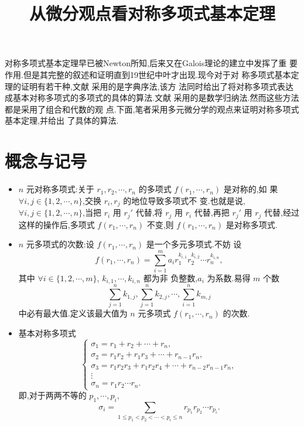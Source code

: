 \documentclass[a4paper]{article}
\begin{document}
\title{\huge{\bf{从微分观点看对称多项式基本定理}}}\date{}
\maketitle
对称多项式基本定理早已被Newton所知,后来又在Galois理论的建立中发挥了重
要作用.但是其完整的叙述和证明直到19世纪中叶才出现\cite{ben}.现今对于对
称多项式基本定理的证明有若干种,文献\cite{zhang} 采用的是字典序法,该方
法同时给出了将对称多项式表达成基本对称多项式的多项式的具体的算法.文献
\cite{edwards} 采用的是数学归纳法.然而这些方法都是采用了组合和代数的观
点.下面,笔者采用多元微分学的观点来证明对称多项式基本定理,并给出
了具体的算法.
\section{概念与记号}
\label{sec:1}
\begin{itemize}
\item $n$ 元对称多项式:关于 $r_1,r_2,\cdots,r_n$ 的多项式 $f(r_1,\cdots,r_n)$ 是对称的,如
  果 $\forall i,j\in \{1,2,\cdots,n\}$,交换 $r_i,r_j$ 的地位导致多项式不
  变.也就是说,$\forall i,j\in \{1,2,\cdots,n\}$,当把 $r_i$ 用 $r_j'$ 代替,将 $r_j$ 用 $r_i$ 代替,再把
  $r_j'$ 用 $r_j$ 代替,经过这样的操作后,多项式 $f(r_1,\cdots,r_n)$ 不变,则
  $f(r_1,\cdots,r_n)$ 是对称多项式.
\item $n$ 元多项式的次数:设 $f(r_1,\cdots,r_n)$ 是一个多元多项式.不妨
  设
$$
f(r_1,\cdots,r_n)=\sum_{i=1}^m a_ir_1^{k_{i,1}}r_2^{k_{i,2}}\cdots r_n^{k_{i,n}},
$$
其中 $\forall i\in \{1,2,\cdots,m\}$, $k_{i,1},\cdots,k_{i,n}$ 都为非
负整数,$a_i$ 为系数.易得 $m$ 个数
$$
\sum_{j=1}^nk_{1,j},\sum_{j=1}^nk_{2,j},\cdots,\sum_{i=1}^nk_{m,j}
$$
中必有最大值.定义该最大值为 $n$ 元多项式 $f(r_1,\cdots,r_n)$ 的次数.
\item 基本对称多项式 $$
  \begin{cases}
    \sigma_1=r_1+r_2+\cdots+r_n,\\
\sigma_2=r_1r_2+r_1r_3+\cdots+r_{n-1}r_n,\\
\sigma_3=r_1r_2r_3+r_1r_2r_4+\cdots+r_{n-2}r_{n-1}r_n,\\
\vdots\\
\sigma_n=r_1r_2\cdots r_n.
  \end{cases}
$$
即,对于两两不等的 $p_1,\cdots,p_i$,
$$
\sigma_i=\sum_{1\leq p_1<p_2<\cdots<p_i\leq n}r_{p_1}r_{p_2}\cdots r_{p_i}.
$$

\end{itemize}
\end{document}

